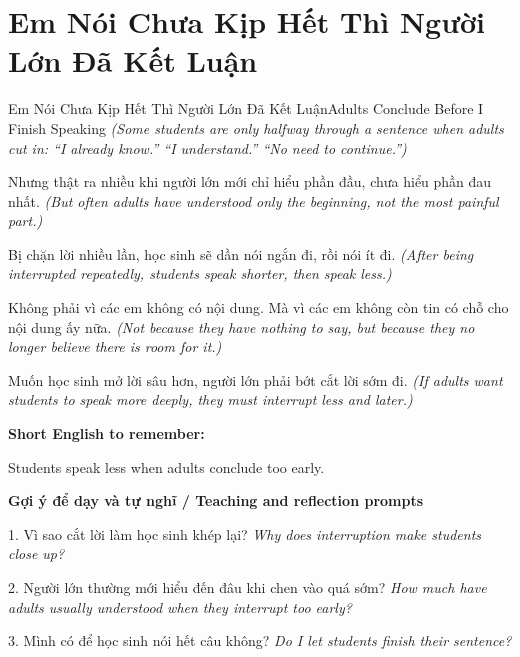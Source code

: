 \section{Em Nói Chưa Kịp Hết Thì Người Lớn Đã Kết Luận}
\begin{truyen}{Em Nói Chưa Kịp Hết Thì Người Lớn Đã Kết Luận}{Adults Conclude Before I Finish Speaking}
\textit{(Some students are only halfway through a sentence when adults cut in: “I already know.” “I understand.” “No need to continue.”)}

Nhưng thật ra nhiều khi người lớn mới chỉ hiểu phần đầu, chưa hiểu phần đau nhất.
\textit{(But often adults have understood only the beginning, not the most painful part.)}

Bị chặn lời nhiều lần, học sinh sẽ dần nói ngắn đi, rồi nói ít đi.
\textit{(After being interrupted repeatedly, students speak shorter, then speak less.)}

Không phải vì các em không có nội dung. Mà vì các em không còn tin có chỗ cho nội dung ấy nữa.
\textit{(Not because they have nothing to say, but because they no longer believe there is room for it.)}

\end{truyen}

\begin{baihoc}
Muốn học sinh mở lời sâu hơn, người lớn phải bớt cắt lời sớm đi.
\textit{(If adults want students to speak more deeply, they must interrupt less and later.)}
\end{baihoc}

\begin{ghinhoanh}
\textbf{Short English to remember:}

Students speak less when adults conclude too early.

\end{ghinhoanh}

\begin{tuhocnhanh}
\textbf{Gợi ý để dạy và tự nghĩ / Teaching and reflection prompts}

1. Vì sao cắt lời làm học sinh khép lại? \textit{Why does interruption make students close up?}

2. Người lớn thường mới hiểu đến đâu khi chen vào quá sớm? \textit{How much have adults usually understood when they interrupt too early?}

3. Mình có để học sinh nói hết câu không? \textit{Do I let students finish their sentence?}
\end{tuhocnhanh}
\ngancach

